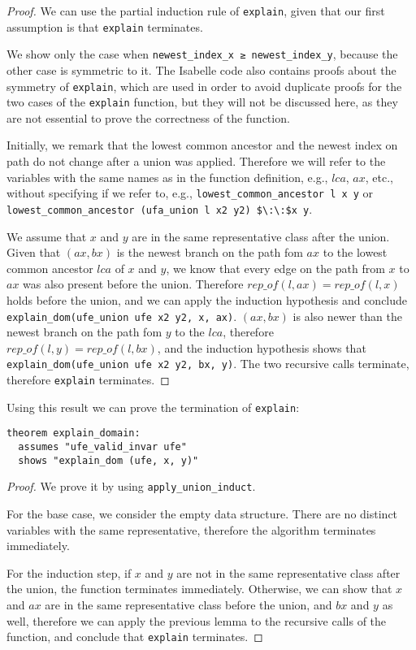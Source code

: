 \begin{proof}
We can use the partial induction rule of \lstinline|explain|, given that our first assumption is that \lstinline|explain| terminates.

We show only the case when \lstinline|newest_index_x ≥ newest_index_y|, because the other case is symmetric to it. The Isabelle code also contains proofs about the symmetry of \lstinline{explain}, which are used in order to avoid duplicate proofs for the two cases of the \lstinline{explain} function, but they will not be discussed here, as they are not essential to prove the correctness of the function.

Initially, we remark that the lowest common ancestor and the newest index on path do not change after a union was applied. Therefore we will refer to the variables with the same names as in the function definition, e.g., $lca$, $ax$, etc., without specifying if we refer to, e.g., \lstinline|lowest_common_ancestor l x y| or \lstinline|lowest_common_ancestor (ufa_union l x2 y2) $\:\:$x y|.

We assume that $x$ and $y$ are in the same representative class after the union. Given that $(ax, bx)$ is the newest branch on the path fom $ax$ to the lowest common ancestor $lca$ of $x$ and $y$, we know that every edge on the path from $x$ to $ax$ was also present before the union. Therefore $rep\_of(l, ax) = rep\_of(l, x)$ holds before the union, and we can apply the induction hypothesis and conclude \lstinline|explain_dom(ufe_union ufe x2 y2, x, ax)|. $(ax, bx)$ is also newer than the newest branch on the path fom $y$ to the $lca$, therefore $rep\_of(l, y) = rep\_of(l, bx)$, and the induction hypothesis shows that \lstinline|explain_dom(ufe_union ufe x2 y2, bx, y)|. The two recursive calls terminate, therefore \lstinline|explain| terminates.
\end{proof}

Using this result we can prove the termination of \lstinline|explain|:

\begin{lstlisting}
theorem explain_domain:
  assumes "ufe_valid_invar ufe"
  shows "explain_dom (ufe, x, y)"
\end{lstlisting}

\begin{proof}
We prove it by using \lstinline|apply_union_induct|.

For the base case, we consider the empty data structure. There are no distinct variables with the same representative, therefore the algorithm terminates immediately.

For the induction step, if $x$ and $y$ are not in the same representative class after the union, the function terminates immediately. Otherwise, we can show that $x$ and $ax$ are in the same representative class before the union, and $bx$ and $y$ as well, therefore we can apply the previous lemma to the recursive calls of the function, and conclude that \lstinline|explain| terminates.
\end{proof}

